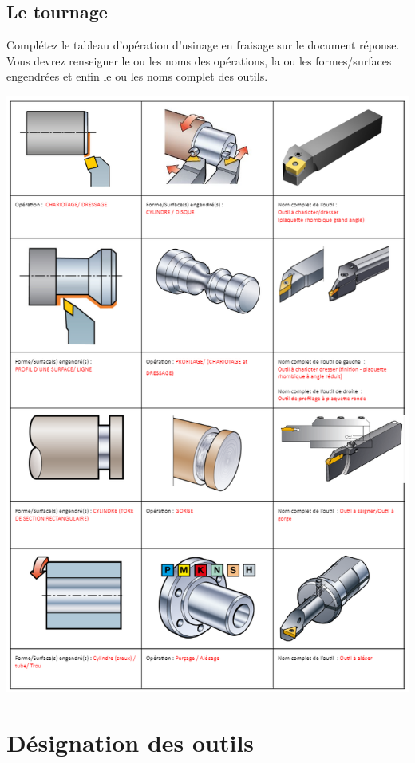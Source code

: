 \documentclass[12pt,a4paper]{article} %
\begin{document}
\subsection{Le tournage}
\begin{exo} Complétez le tableau d'opération d'usinage en fraisage sur le document réponse. Vous devrez renseigner le ou les noms des opérations, la ou les formes/surfaces engendrées et enfin le ou les noms complet des outils.  \end{exo}
\begin{center}
\includegraphics[scale=1.1]{CORR2.png}
\end{center}

\newpage

\section{Désignation des outils}
\end{document}

